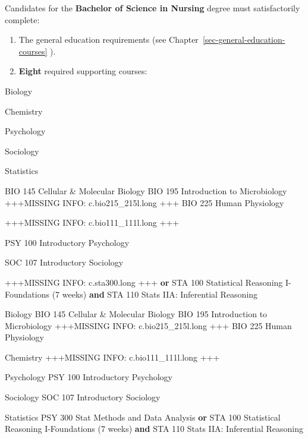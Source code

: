 \documentclass[
  letterpaper,
]{scrbook}
\begin{document}
Candidates for the \textbf{Bachelor of Science in Nursing} degree must
satisfactorily complete:

\begin{enumerate}
\def\labelenumi{\arabic{enumi}.}
\item
  The general education requirements (see
  Chapter~\ref{sec-general-education-courses} ).
\item
  \textbf{Eight} required supporting courses:
\end{enumerate}

Biology

Chemistry

Psychology

Sociology

Statistics

BIO 145 Cellular \& Molecular Biology BIO 195 Introduction to
Microbiology +++MISSING INFO: c.bio215\_215l.long +++ BIO 225 Human
Physiology

+++MISSING INFO: c.bio111\_111l.long +++

PSY 100 Introductory Psychology

SOC 107 Introductory Sociology

+++MISSING INFO: c.sta300.long +++ \textbf{or} STA 100 Statistical
Reasoning I-Foundations (7 weeks) \textbf{and} STA 110 Stats IIA:
Inferential Reasoning

Biology BIO 145 Cellular \& Molecular Biology BIO 195 Introduction to
Microbiology +++MISSING INFO: c.bio215\_215l.long +++ BIO 225 Human
Physiology

Chemistry +++MISSING INFO: c.bio111\_111l.long +++

Psychology PSY 100 Introductory Psychology

Sociology SOC 107 Introductory Sociology

Statistics PSY 300 Stat Methods and Data Analysis \textbf{or} STA 100
Statistical Reasoning I-Foundations (7 weeks) \textbf{and} STA 110 Stats
IIA: Inferential Reasoning
\end{document}
